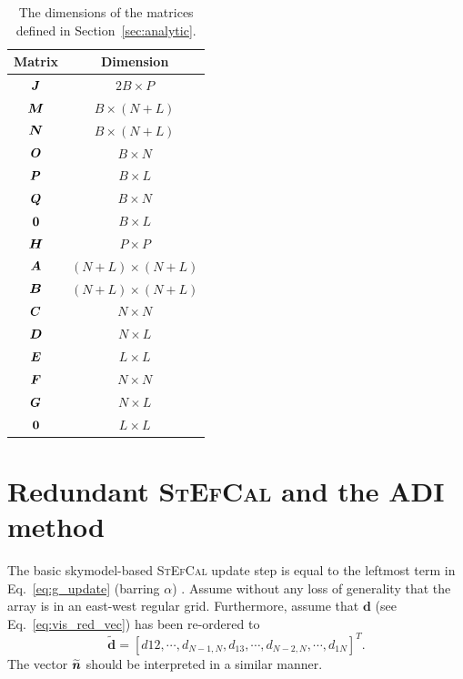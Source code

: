 \documentclass[useAMS,usenatbib]{mn2e}
\newcommand{\bA}{\bmath{A}}
\newcommand{\bB}{\bmath{B}}
\newcommand{\bC}{\bmath{C}}
\newcommand{\bE}{\bmath{E}}
\newcommand{\bF}{\bmath{F}}
\newcommand{\bG}{\bmath{G}}
\newcommand{\bn}{\bmath{n}}
\newcommand{\bJ}{\bmath{J}}
\newcommand{\bD}{\bmath{D}}
\newcommand{\bH}{\bmath{H}}
\newcommand{\bN}{\bmath{N}}
\newcommand{\bM}{\bmath{M}}
\newcommand{\bO}{\bmath{O}}
\newcommand{\bP}{\bmath{P}}
\newcommand{\bQ}{\bmath{Q}}
\newcommand{\bzero}{\bmath{0}}
\begin{document}
\begin{table}
\centering
\caption{The dimensions of the matrices defined in Section~\ref{sec:analytic}.}
\begin{tabular}{|c c|} 
\hline
Matrix & Dimension\\
\hline
\hline
$\bJ$ & $2B \times P$ \\
$\bM$ & $B \times (N+L)$ \\
$\bN$ & $B \times (N+L)$ \\
$\bO$ & $B \times N$ \\
$\bP$ & $B \times L$ \\
$\bQ$ & $B \times N$ \\
$\bzero$ & $B \times L$ \\
\hline
\hline
$\bH$ & $P\times P$\\
$\bA$ & $(N+L)\times (N+L)$\\
$\bB$ & $(N+L)\times (N+L)$\\
$\bC$ & $N \times N$\\
$\bD$ & $N \times L$\\
$\bE$ & $L \times L$\\
$\bF$ & $N \times N$\\
$\bG$ & $N \times L$\\
$\bzero$ & $L \times L$\\
\hline
\end{tabular}
\label{tab:matrix_dimensions}
\end{table}

\section{Redundant \textsc{StEfCal} and the ADI method}
\label{sec:red_stef_ADI}
The basic skymodel-based \textsc{StEfCal} update step is equal to  the leftmost term in Eq.~\eqref{eq:g_update} (barring $\alpha$) \citep{Salvini2014}.
Assume without any loss of generality that the array is in an east-west regular grid. Furthermore, assume that $\boldsymbol{d}$ (see Eq.~\eqref{eq:vis_red_vec}) has been re-ordered to
\begin{equation}
\widetilde{\boldsymbol{d}} = \left[d{12},\cdots,d_{N-1,N},d_{13},\cdots,d_{N-2,N},\cdots,d_{1N}\right]^T .
\end{equation}
The vector $\widetilde{\bn}$ should be interpreted in a similar manner.
\end{document}
